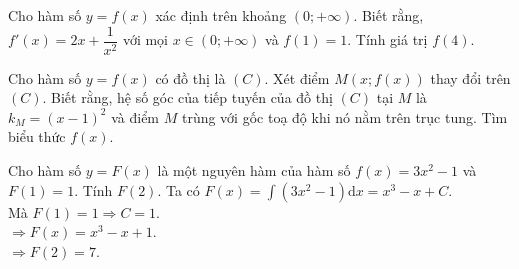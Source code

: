 \begin{bt}%
 
	Cho hàm số $y = f(x)$ xác định trên khoảng $(0; +\infty)$. Biết rằng, $f'(x) = 2x + \dfrac{1}{x^2}$ với mọi $x \in (0; +\infty)$ và $f(1) = 1$. Tính giá trị $f(4)$.
\end{bt}

\begin{bt}%
 
	Cho hàm số $y = f(x)$ có đồ thị là $(C)$. Xét điểm $M(x; f(x))$ thay đổi trên $(C)$. Biết rằng, hệ số góc của tiếp tuyến của đồ thị $(C)$ tại $M$ là $k_M = (x - 1)^2$ và điểm $M$ trùng với gốc toạ độ khi nó nằm trên trục tung. Tìm biểu thức $f(x)$.
\end{bt}

\begin{bt}%

	Cho hàm số $y=F(x)$ là một nguyên hàm của hàm số $f(x) = 3x^2-1$ và $F(1) = 1$. Tính $F(2)$.
	\loigiai
	{
		Ta có $F(x) = \displaystyle \int  \left(3x^2-1\right) \mathrm{d}x = x^3 - x + C$.\\
		Mà $F(1) = 1 \Rightarrow C = 1$.\\
		$\Rightarrow F(x) = x^3 - x + 1$.\\
		$\Rightarrow F(2) = 7$.
	}
\end{bt}

